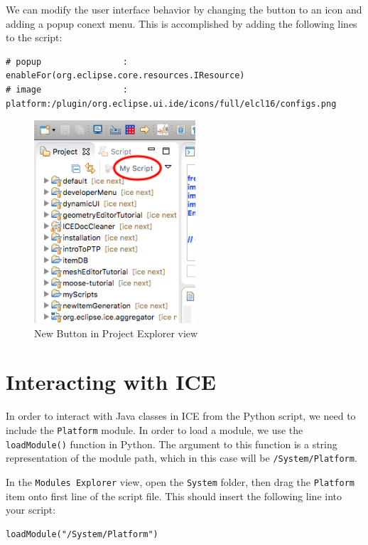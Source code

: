 We can modify the user interface behavior by changing the button to an icon and
adding a popup conext menu. This is accomplished by adding the following lines
to the script:

{\small
\begin{verbatim}
# popup				   : enableFor(org.eclipse.core.resources.IResource) 
# image				   : platform:/plugin/org.eclipse.ui.ide/icons/full/elcl16/configs.png
\end{verbatim}
}

\begin{figure}[!ht]
\centering
\includegraphics[width=6cm]{images/projexplorer}
\caption{New Button in Project Explorer view}
\label{fig:myscript}
\end{figure}

\section{Interacting with ICE}

In order to interact with Java classes in ICE from the Python script, we 
need to include the \texttt{Platform} module. In order to load a module, we use
the \texttt{loadModule()} function in Python. The argument to this function is a
string representation of the module path, which in this case will be
\texttt{/System/Platform}. 

In the \texttt{Modules Explorer} view, open the \texttt{System} folder, then drag
the \texttt{Platform} item onto first line of the script file. This should insert
the following line into your script:

\lstset{basicstyle=\ttfamily\small, breaklines}

{\small
\begin{verbatim}
loadModule("/System/Platform")
\end{verbatim}
}

